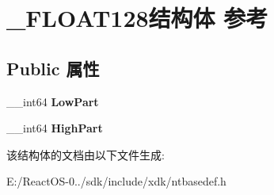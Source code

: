 \hypertarget{struct___f_l_o_a_t128}{}\section{\+\_\+\+F\+L\+O\+A\+T128结构体 参考}
\label{struct___f_l_o_a_t128}
\subsection*{Public 属性}
\begin{DoxyCompactItemize}
\item 
\mbox{\label{struct___f_l_o_a_t128_affa0f25029bc46e01778f5a7f6dc3e43}} 
\+\_\+\+\_\+int64 {\bfseries Low\+Part}
\item 
\mbox{\label{struct___f_l_o_a_t128_a7fe67793528f7f55b73ab95f49dfdae5}} 
\+\_\+\+\_\+int64 {\bfseries High\+Part}
\end{DoxyCompactItemize}


该结构体的文档由以下文件生成\+:\begin{DoxyCompactItemize}
\item 
E\+:/\+React\+O\+S-\/0../sdk/include/xdk/ntbasedef.\+h\end{DoxyCompactItemize}
